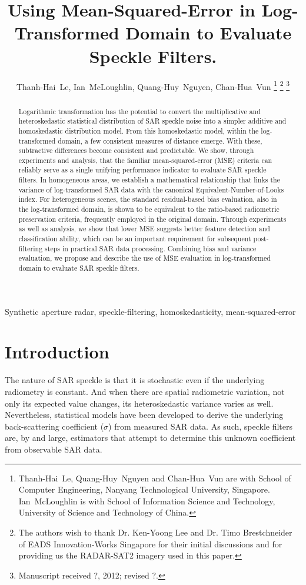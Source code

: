 \documentclass[journal]{IEEEtran}
\title{ 
	Using Mean-Squared-Error in Log-Transformed Domain to Evaluate Speckle Filters.
}
\author{Thanh-Hai~Le,
        Ian~McLoughlin, 
	Quang-Huy~Nguyen,
	Chan-Hua~Vun%
\thanks{Thanh-Hai~Le, Quang-Huy~Nguyen and Chan-Hua~Vun are with School of Computer Engineering, 
Nanyang Technological University, Singapore. Ian~McLoughlin is with School of Information Science and Technology,
University of Science and Technology of China.
}%
\thanks{The authors wish to thank Dr. Ken-Yoong Lee and Dr. Timo Brestchneider of EADS Innovation-Works Singapore for 
	their initial discussions and for providing us the RADAR-SAT2 imagery used in this paper. }%
\thanks{Manuscript received ?, 2012; revised ?.}}
\begin{document}
\maketitle

\begin{abstract}
Logarithmic transformation has the potential to convert 
	the multiplicative and heteroskedastic statistical distribution of SAR speckle noise into 
	a simpler additive and homoskedastic distribution model.
From this homoskedastic model, within the log-transformed domain, 
	a few consistent measures of distance emerge.
With these, subtractive differences become consistent and predictable. 
We show, through experiments and analysis, that 
	the familiar mean-squared-error (MSE) criteria can reliably serve 
	as a single unifying performance indicator to evaluate SAR speckle filters. 
In homogeneous areas, we establish a mathematical relationship that links the variance of 
	log-transformed SAR data with the canonical Equivalent-Number-of-Looks index.
For heterogeneous scenes, the standard residual-based bias evaluation, also in the log-transformed domain, 
	is shown to be equivalent to the ratio-based radiometric preservation criteria, frequently employed in the 
	original domain. 
Through experiments as well as analysis, we show that lower MSE suggests better feature detection and classification
	ability, which can be an important requirement for subsequent post-filtering steps in practical SAR data processing.
Combining bias and variance evaluation, we propose and describe the use of MSE evaluation in log-transformed domain to evaluate SAR speckle 
	filters.
\end{abstract}

\begin{IEEEkeywords}
Synthetic aperture radar, speckle-filtering, homoskedasticity, mean-squared-error
\end{IEEEkeywords}

\IEEEpeerreviewmaketitle

\section{Introduction}

The nature of SAR speckle is that
	it is stochastic even if the underlying radiometry is constant. 
And when there are spatial radiometric variation, not only its expected value changes, its heteroskedastic variance varies as well.
Nevertheless, statistical models have been developed to derive the underlying back-scattering coefficient ($\sigma$) from measured SAR data. 
As such, speckle filters are, by and large, estimators that attempt to determine this unknown coefficient from observable SAR data. 
\end{document}
